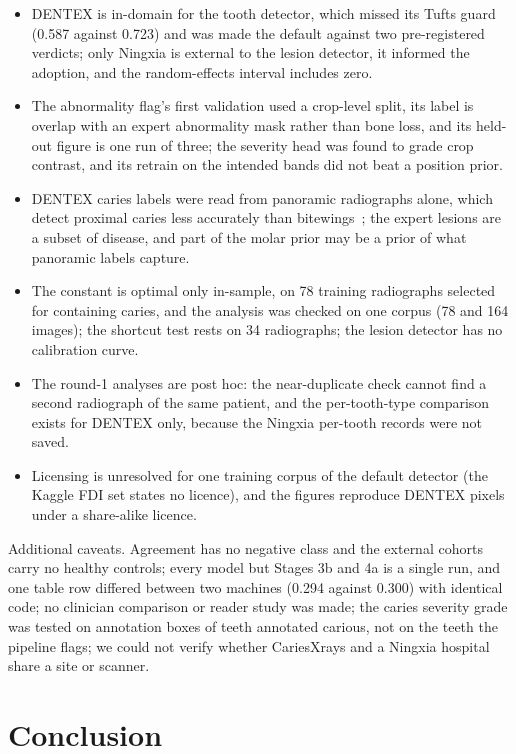 \documentclass[conference]{IEEEtran}
\begin{document}
\begin{itemize}
\item DENTEX is in-domain for the tooth detector, which missed its Tufts guard (0.587 against 0.723) and was made the default against two pre-registered verdicts; only Ningxia is external to the lesion detector, it informed the adoption, and the random-effects interval includes zero.
\item The abnormality flag's first validation used a crop-level split, its label is overlap with an expert abnormality mask rather than bone loss, and its held-out figure is one run of three; the severity head was found to grade crop contrast, and its retrain on the intended bands did not beat a position prior.
\item DENTEX caries labels were read from panoramic radiographs alone, which detect proximal caries less accurately than bitewings~\cite{akarslan2008comparison}; the expert lesions are a subset of disease, and part of the molar prior may be a prior of what panoramic labels capture.
\item The constant is optimal only in-sample, on 78 training radiographs selected for containing caries, and the analysis was checked on one corpus (78 and 164 images); the shortcut test rests on 34 radiographs; the lesion detector has no calibration curve.
\item The round-1 analyses are post hoc: the near-duplicate check cannot find a second radiograph of the same patient, and the per-tooth-type comparison exists for DENTEX only, because the Ningxia per-tooth records were not saved.
\item Licensing is unresolved for one training corpus of the default detector (the Kaggle FDI set states no licence), and the figures reproduce DENTEX pixels under a share-alike licence.
\end{itemize}

Additional caveats. Agreement has no negative class and the external cohorts carry no healthy controls; every model but Stages 3b and 4a is a single run, and one table row differed between two machines (0.294 against 0.300) with identical code; no clinician comparison or reader study was made; the caries severity grade was tested on annotation boxes of teeth annotated carious, not on the teeth the pipeline flags; we could not verify whether CariesXrays and a Ningxia hospital share a site or scanner.

\section{Conclusion}
\end{document}
